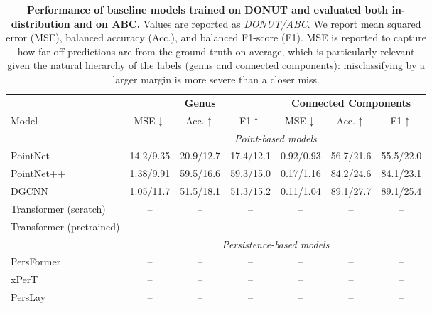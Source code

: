 \begin{table}[h]
\centering
\begin{tabular}{l|ccc|ccc}
\toprule
 & \multicolumn{3}{c|}{\textbf{Genus}} & \multicolumn{3}{c}{\textbf{Connected Components}} \\
Model & MSE$\downarrow$ & Acc.$\uparrow$ & F1$\uparrow$ & MSE$\downarrow$ & Acc.$\uparrow$ & F1$\uparrow$ \\
\midrule
\multicolumn{1}{l}{} & \multicolumn{6}{c}{\textit{Point-based models}} \\
\midrule
PointNet~\cite{pointnet}   & 14.2/9.35 & 20.9/12.7 & 17.4/12.1 & 0.92/0.93 & 56.7/21.6 & 55.5/22.0 \\
PointNet++~\cite{pointnet++} &  1.38/9.91 & 59.5/16.6 & 59.3/15.0 & 0.17/1.16 & 84.2/24.6 & 84.1/23.1 \\
DGCNN~\cite{dgcnn}      & 1.05/11.7 & 51.5/18.1 & 51.3/15.2 & 0.11/1.04 & 89.1/27.7 & 89.1/25.4 \\
Transformer (scratch) & -- & -- & -- & -- & -- & -- \\
Transformer (pretrained) & -- & -- & -- & -- & -- & -- \\
\midrule
\multicolumn{1}{l}{} & \multicolumn{6}{c}{\textit{Persistence-based models}} \\
\midrule
PersFormer~\cite{persformer} & -- & -- & -- & -- & -- & -- \\
xPerT~\cite{xpert}      & -- & -- & -- & -- & -- & -- \\
PersLay~\cite{perslay}    & -- & -- & -- & -- & -- & -- \\
\bottomrule
\end{tabular}
\caption{\textbf{Performance of baseline models trained on DONUT and evaluated both in-distribution and on ABC.} Values are reported as \textit{DONUT/ABC}. We report mean squared error (MSE), balanced accuracy (Acc.), and balanced F1-score (F1). MSE is reported to capture how far off predictions are from the ground-truth on average, which is particularly relevant given the natural hierarchy of the labels (genus and connected components): misclassifying by a larger margin is more severe than a closer miss. }
\label{tab:topogen-results}
\end{table}